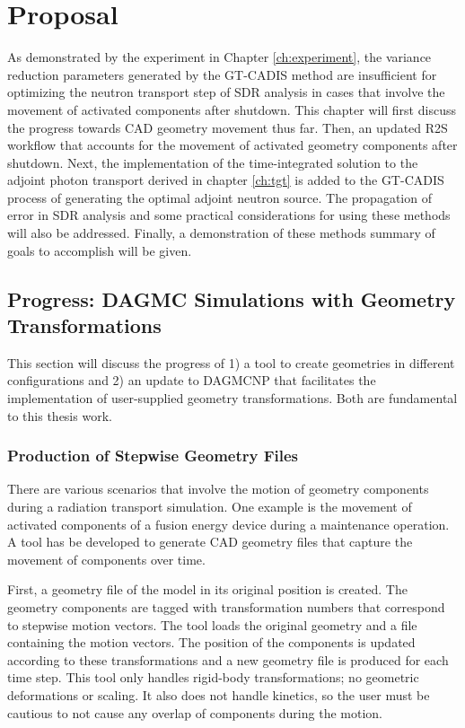 
\chapter{Proposal}\label{ch:proposal}

As demonstrated by the experiment in Chapter \ref{ch:experiment},  the variance
reduction parameters generated by the GT-CADIS method are insufficient for
optimizing the neutron transport step of SDR analysis in cases that involve the movement 
of activated components after shutdown.  
This chapter will first discuss the progress towards CAD geometry movement
thus far.
Then, an updated R2S workflow that accounts for the movement of
activated geometry components after shutdown.  Next, the implementation
of the time-integrated solution to the adjoint photon transport derived in
chapter \ref{ch:tgt} is added to the GT-CADIS process of generating the
optimal adjoint neutron source. The propagation of error
in SDR analysis and some practical considerations for
using these methods will also be addressed. 
Finally, a demonstration of these methods 
summary of goals to accomplish will be given.

\section{Progress: DAGMC Simulations with Geometry Transformations}\label{sec:dagmc_trans}
This section will discuss the progress of 1) a tool to create geometries in
different configurations and 2) an update to DAGMCNP that facilitates the
implementation of user-supplied geometry transformations. Both are fundamental to 
this thesis work.

\subsection{Production of Stepwise Geometry Files}\label{sec:timestep_geoms}
There are various scenarios that involve the motion of geometry components 
during a radiation transport simulation.  One example is the movement of
activated components of a fusion energy device during a maintenance operation.
A tool has be developed to generate CAD geometry files that capture the 
movement of components over time.  

First, a geometry file of the model in its 
original position is created. The geometry components are tagged with 
transformation numbers that correspond to stepwise motion vectors.
The tool loads the original geometry and a file containing the motion vectors.
The position of the components 
is updated according to these transformations and a new geometry file is 
produced for each time step.  This tool only handles rigid-body
transformations; no geometric deformations or scaling.  It also does not handle kinetics, 
so the user must be cautious to not cause any overlap of components during the
motion.  

